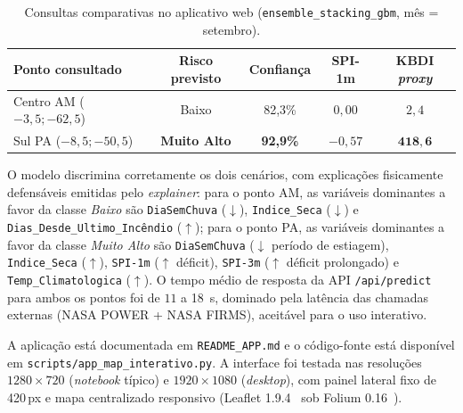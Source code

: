 \begin{table}[h]
\centering
\caption{Consultas comparativas no aplicativo web (\texttt{ensemble\_stacking\_gbm}, mês = setembro).}
\label{tab:res_smoke}
\small
\begin{tabular}{lcccc}
\toprule
\textbf{Ponto consultado} & \textbf{Risco previsto} & \textbf{Confiança} & \textbf{SPI-1m} & \textbf{KBDI \emph{proxy}} \\
\midrule
Centro AM ($-3{,}5; -62{,}5$) & Baixo       & 82,3\% & $0{,}00$ & $2{,}4$ \\
Sul PA ($-8{,}5; -50{,}5$)    & \textbf{Muito Alto} & \textbf{92,9\%} & $-0{,}57$ & $\mathbf{418{,}6}$ \\
\bottomrule
\end{tabular}
\end{table}

O modelo discrimina corretamente os dois cenários, com explicações fisicamente defensáveis emitidas pelo \emph{explainer}: para o ponto AM, as variáveis dominantes a favor da classe \emph{Baixo} são \texttt{DiaSemChuva} (\(\downarrow\)), \texttt{Indice\_Seca} (\(\downarrow\)) e \texttt{Dias\_Desde\_Ultimo\_Incêndio} (\(\uparrow\)); para o ponto PA, as variáveis dominantes a favor da classe \emph{Muito Alto} são \texttt{DiaSemChuva} (\(\downarrow\) período de estiagem), \texttt{Indice\_Seca} (\(\uparrow\)), \texttt{SPI-1m} (\(\uparrow\) déficit), \texttt{SPI-3m} (\(\uparrow\) déficit prolongado) e \texttt{Temp\_Climatologica} (\(\uparrow\)). O tempo médio de resposta da API \texttt{/api/predict} para ambos os pontos foi de \(11\) a \SI{18}{\second}, dominado pela latência das chamadas externas (NASA POWER + NASA FIRMS), aceitável para o uso interativo.

A aplicação está documentada em \texttt{README\_APP.md} e o código-fonte está disponível em \texttt{scripts/app\_map\_interativo.py}. A interface foi testada nas resoluções $1280 \times 720$ (\emph{notebook} típico) e $1920 \times 1080$ (\emph{desktop}), com painel lateral fixo de \num{420}\,px e mapa centralizado responsivo (Leaflet 1.9.4~\cite{leafletjs} sob Folium 0.16~\cite{folium}).
